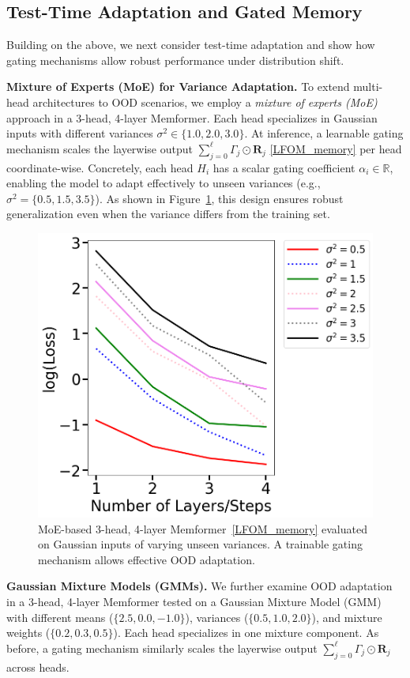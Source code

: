 \documentclass[11pt]{article}
\theoremstyle{plain}
\theoremstyle{definition}
\theoremstyle{remark}
\numberwithin{equation}{section}
\begin{document}
\subsection{Test-Time Adaptation and Gated Memory}
\label{sec:test_time_adaptation}
Building on the above, we next consider test-time adaptation and show how gating mechanisms allow robust performance under distribution shift.

\textbf{Mixture of Experts (MoE) for Variance Adaptation.}
To extend multi-head architectures to OOD scenarios, we employ a \emph{mixture of experts (MoE)} approach \cite{jacobs1991adaptive} in a 3-head, 4-layer Memformer. Each head specializes in Gaussian inputs with different variances \(\sigma^2 \in \{1.0, 2.0, 3.0\}\). At inference, a learnable gating mechanism scales the layerwise output \(\sum_{j=0}^{\ell}\Gamma_j \odot \mathbf{R}_j\) \eqref{LFOM_memory} per head coordinate-wise. Concretely, each head \(H_i\) has a scalar gating coefficient \(\alpha_i \in \mathbb{R}\), enabling the model to adapt effectively to unseen variances (e.g., \(\sigma^2 = \{0.5,1.5,3.5\}\)). As shown in Figure~\ref{fig:mixture_of_experts_ood}, this design ensures robust generalization even when the variance differs from the training set.
\begin{figure}[t]
  \centering
  \includegraphics[width=0.7\linewidth]{mixture_of_experts_ood_v2.png}
  \caption{%
  MoE-based 3-head, 4-layer Memformer~\eqref{LFOM_memory} evaluated on
  Gaussian inputs of varying unseen variances. A trainable gating mechanism
  allows effective OOD adaptation.}
  \label{fig:mixture_of_experts_ood}
\end{figure}

\textbf{Gaussian Mixture Models (GMMs).}
We further examine OOD adaptation in a 3-head, 4-layer Memformer tested on a Gaussian Mixture Model (GMM) with different means (\(\{2.5,0.0,-1.0\}\)), variances (\(\{0.5,1.0,2.0\}\)), and mixture weights (\(\{0.2,0.3,0.5\}\)). Each head specializes in one mixture component. As before, a gating mechanism similarly scales the layerwise output \(\sum_{j=0}^{\ell}\Gamma_j \odot \mathbf{R}_j\) across heads.
\end{document}
